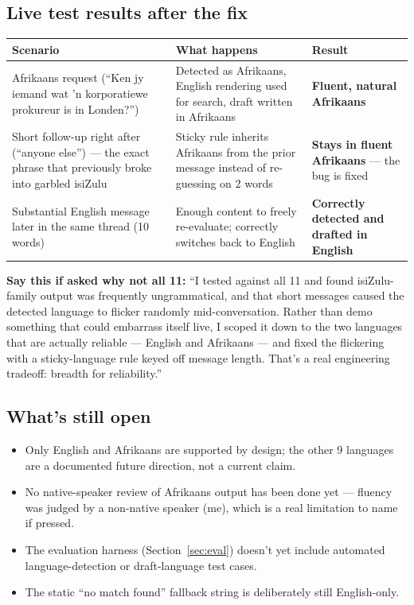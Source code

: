\documentclass[11pt, a4paper]{article}
\newcommand{\good}[1]{\textcolor{good}{\textbf{#1}}}
\begin{document}
\subsection{Live test results after the fix}
\begin{longtable}{@{}p{4.5cm}p{5.5cm}p{5.5cm}@{}}
\toprule
Scenario & What happens & Result \\
\midrule
\endhead
Afrikaans request (``Ken jy iemand wat 'n korporatiewe prokureur is in Londen?'') & Detected as Afrikaans, English rendering used for search, draft written in Afrikaans & \good{Fluent, natural Afrikaans} \\
Short follow-up right after (``anyone else'') --- the exact phrase that previously broke into garbled isiZulu & Sticky rule inherits Afrikaans from the prior message instead of re-guessing on 2 words & \good{Stays in fluent Afrikaans} --- the bug is fixed \\
Substantial English message later in the same thread (10 words) & Enough content to freely re-evaluate; correctly switches back to English & \good{Correctly detected and drafted in English} \\
\bottomrule
\end{longtable}

\textbf{Say this if asked why not all 11:} ``I tested against all 11 and found isiZulu-family output was frequently ungrammatical, and that short messages caused the detected language to flicker randomly mid-conversation. Rather than demo something that could embarrass itself live, I scoped it down to the two languages that are actually reliable --- English and Afrikaans --- and fixed the flickering with a sticky-language rule keyed off message length. That's a real engineering tradeoff: breadth for reliability.''

\subsection{What's still open}
\begin{itemize}
    \item Only English and Afrikaans are supported by design; the other 9 languages are a documented future direction, not a current claim.
    \item No native-speaker review of Afrikaans output has been done yet --- fluency was judged by a non-native speaker (me), which is a real limitation to name if pressed.
    \item The evaluation harness (Section~\ref{sec:eval}) doesn't yet include automated language-detection or draft-language test cases.
    \item The static ``no match found'' fallback string is deliberately still English-only.
\end{itemize}
\end{document}
